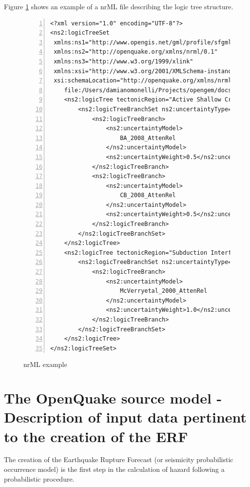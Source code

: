 Figure \ref{fig:nrMl_logic_tree_example} shows an example of a nrML file 
describing the logic tree structure.
%
\begin{figure}[!ht]
\small
\begin{Verbatim}[numbers=left,frame=single,fontsize=\small]
<?xml version="1.0" encoding="UTF-8"?>
<ns2:logicTreeSet 
 xmlns:ns1="http://www.opengis.net/gml/profile/sfgml/1.0"
 xmlns:ns2="http://openquake.org/xmlns/nrml/0.1"
 xmlns:ns3="http://www.w3.org/1999/xlink"
 xmlns:xsi="http://www.w3.org/2001/XMLSchema-instance"
 xsi:schemaLocation="http://openquake.org/xmlns/nrml/0.1 
    file:/Users/damianomonelli/Projects/opengem/docs/schema/nrml_seismic.xsd">
    <ns2:logicTree tectonicRegion="Active Shallow Crust">
        <ns2:logicTreeBranchSet ns2:uncertaintyType="gmpeModel">
            <ns2:logicTreeBranch>
                <ns2:uncertaintyModel>
                    BA_2008_AttenRel
                </ns2:uncertaintyModel>
                <ns2:uncertaintyWeight>0.5</ns2:uncertaintyWeight>
            </ns2:logicTreeBranch>
            <ns2:logicTreeBranch>
                <ns2:uncertaintyModel>
                    CB_2008_AttenRel
                </ns2:uncertaintyModel>
                <ns2:uncertaintyWeight>0.5</ns2:uncertaintyWeight>
            </ns2:logicTreeBranch>
        </ns2:logicTreeBranchSet>
    </ns2:logicTree>
    <ns2:logicTree tectonicRegion="Subduction Interface">
        <ns2:logicTreeBranchSet ns2:uncertaintyType="gmpeModel">
            <ns2:logicTreeBranch>
                <ns2:uncertaintyModel>
                    McVerryetal_2000_AttenRel
                </ns2:uncertaintyModel>
                <ns2:uncertaintyWeight>1.0</ns2:uncertaintyWeight>
            </ns2:logicTreeBranch>
        </ns2:logicTreeBranchSet>
    </ns2:logicTree>
</ns2:logicTreeSet>
\end{Verbatim}
\normalsize
\caption{nrML example}
\label{fig:nrMl_logic_tree_example}
\vspace*{1em}
\end{figure}
%
\section[The OpenQuake source model]{The OpenQuake source model - Description 
of input data pertinent to the creation of the ERF}
%
The creation of the Earthquake Rupture Forecast (or seismicity probabilistic 
occurrence model) is the first step in the calculation of hazard following a 
probabilistic procedure. 

